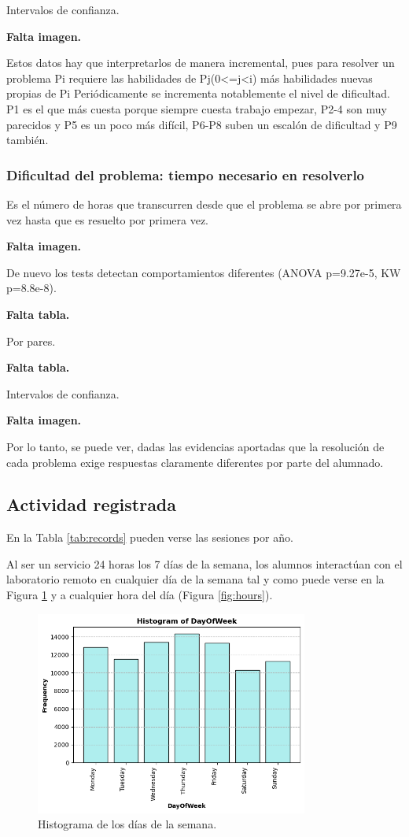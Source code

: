 Intervalos de confianza.

\textbf{Falta imagen.}

Estos datos hay que interpretarlos de manera incremental, pues para resolver un problema Pi requiere las habilidades de Pj(0<=j<i) más habilidades nuevas propias de Pi Periódicamente se incrementa notablemente el nivel de dificultad. P1 es el que más cuesta porque siempre cuesta trabajo empezar, P2-4 son muy parecidos y P5 es un poco más difícil, P6-P8 suben un escalón de dificultad y P9 también.

\subsubsection{Dificultad del problema: tiempo necesario en resolverlo}

Es el número de horas que transcurren desde que el problema se abre por primera vez hasta que es resuelto por primera vez.

\textbf{Falta imagen.}

De nuevo los tests detectan comportamientos diferentes (ANOVA p=9.27e-5, KW p=8.8e-8).

\textbf{Falta tabla.}

Por pares.

\textbf{Falta tabla.}

Intervalos de confianza.

\textbf{Falta imagen.}

Por lo tanto, se puede ver, dadas las evidencias aportadas que la resolución de cada problema exige respuestas claramente diferentes por parte del alumnado.

\subsection{Actividad registrada}

En la Tabla \ref{tab:records} pueden verse las sesiones por año.

Al ser un servicio 24 horas los 7 días de la semana, los alumnos interactúan con el laboratorio remoto en cualquier día de la semana tal y como puede verse en la Figura \ref{fig:days} y a cualquier hora del día (Figura \ref{fig:hours}).

\begin{figure}[H]
    \centering
    \includegraphics[width=0.80\textwidth]{imagenes/histogramdayofweek.png}
    \caption{Histograma de los días de la semana.}
    \label{fig:days}
\end{figure}

